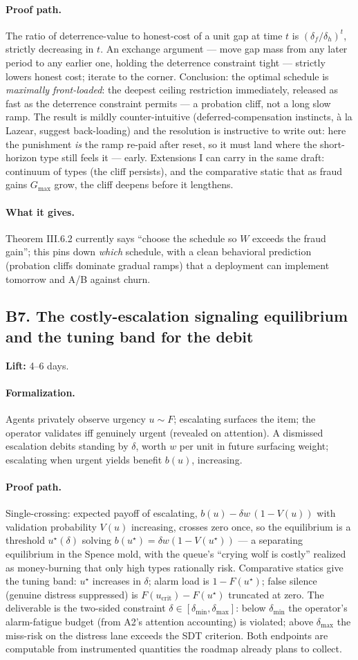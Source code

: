 \documentclass[11pt,a4paper]{article}
\newcommand{\lift}[1]{\noindent\textbf{Lift:} #1.}
\newcommand{\gives}{\paragraph{What it gives.}}
\newcommand{\form}{\paragraph{Formalization.}}
\newcommand{\proofpath}{\paragraph{Proof path.}}
\begin{document}
\proofpath The ratio of deterrence-value to honest-cost of a unit gap at time $t$ is $(\delta_f/\delta_h)^t$, strictly decreasing in $t$. An exchange argument --- move gap mass from any later period to any earlier one, holding the deterrence constraint tight --- strictly lowers honest cost; iterate to the corner. Conclusion: the optimal schedule is \emph{maximally front-loaded}: the deepest ceiling restriction immediately, released as fast as the deterrence constraint permits --- a probation cliff, not a long slow ramp. The result is mildly counter-intuitive (deferred-compensation instincts, \`a la Lazear, suggest back-loading) and the resolution is instructive to write out: here the punishment \emph{is} the ramp re-paid after reset, so it must land where the short-horizon type still feels it --- early. Extensions I can carry in the same draft: continuum of types (the cliff persists), and the comparative static that as fraud gains $G_{\max}$ grow, the cliff deepens before it lengthens.

\gives Theorem III.6.2 currently says ``choose the schedule so $W$ exceeds the fraud gain''; this pins down \emph{which} schedule, with a clean behavioral prediction (probation cliffs dominate gradual ramps) that a deployment can implement tomorrow and A/B against churn.

\subsection{B7. The costly-escalation signaling equilibrium and the tuning band for the debit}
\lift{4--6 days}

\form Agents privately observe urgency $u \sim F$; escalating surfaces the item; the operator validates iff genuinely urgent (revealed on attention). A dismissed escalation debits standing by $\delta$, worth $w$ per unit in future surfacing weight; escalating when urgent yields benefit $b(u)$, increasing.

\proofpath Single-crossing: expected payoff of escalating, $b(u) - \delta w\,(1 - V(u))$ with validation probability $V(u)$ increasing, crosses zero once, so the equilibrium is a threshold $u^\star(\delta)$ solving $b(u^\star) = \delta w (1 - V(u^\star))$ --- a separating equilibrium in the Spence mold, with the queue's ``crying wolf is costly'' realized as money-burning that only high types rationally risk. Comparative statics give the tuning band: $u^\star$ increases in $\delta$; alarm load is $1 - F(u^\star)$; false silence (genuine distress suppressed) is $F(u_{\mathrm{crit}}) - F(u^\star)$ truncated at zero. The deliverable is the two-sided constraint $\delta \in [\delta_{\min}, \delta_{\max}]$: below $\delta_{\min}$ the operator's alarm-fatigue budget (from A2's attention accounting) is violated; above $\delta_{\max}$ the miss-risk on the distress lane exceeds the SDT criterion. Both endpoints are computable from instrumented quantities the roadmap already plans to collect.
\end{document}
